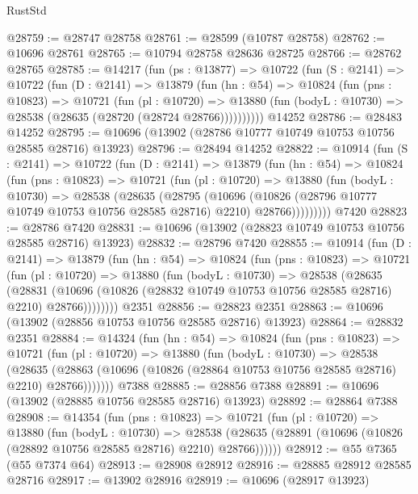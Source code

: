 \begin{lexlean}{RustStd}
\begin{coremodule}
@28759 := @28747 @28758
@28761 := @28599 (@10787 @28758)
@28762 := @10696 @28761
@28765 := @10794 @28758 @28636 @28725
@28766 := @28762 @28765
@28785 := @14217
    (fun (ps : @13877) =>
    @10722
      (fun (S : @2141) =>
      @10722
        (fun (D : @2141) =>
        @13879
          (fun (hn : @54) =>
          @10824
            (fun (pns : @10823) =>
            @10721
              (fun (pl : @10720) =>
              @13880 (fun (bodyL : @10730) => @28538 (@28635 (@28720 (@28724 @28766))))))))))
    @14252
@28786 := @28483 @14252
@28795 := @10696 (@13902 (@28786 @10777 @10749 @10753 @10756 @28585 @28716) @13923)
@28796 := @28494 @14252
@28822 := @10914
    (fun (S : @2141) =>
    @10722
      (fun (D : @2141) =>
      @13879
        (fun (hn : @54) =>
        @10824
          (fun (pns : @10823) =>
          @10721
            (fun (pl : @10720) =>
            @13880
              (fun (bodyL : @10730) =>
              @28538
                (@28635
                  (@28795
                    (@10696
                      (@10826 (@28796 @10777 @10749 @10753 @10756 @28585 @28716) @2210)
                      @28766)))))))))
    @7420
@28823 := @28786 @7420
@28831 := @10696 (@13902 (@28823 @10749 @10753 @10756 @28585 @28716) @13923)
@28832 := @28796 @7420
@28855 := @10914
    (fun (D : @2141) =>
    @13879
      (fun (hn : @54) =>
      @10824
        (fun (pns : @10823) =>
        @10721
          (fun (pl : @10720) =>
          @13880
            (fun (bodyL : @10730) =>
            @28538
              (@28635
                (@28831
                  (@10696 (@10826 (@28832 @10749 @10753 @10756 @28585 @28716) @2210) @28766))))))))
    @2351
@28856 := @28823 @2351
@28863 := @10696 (@13902 (@28856 @10753 @10756 @28585 @28716) @13923)
@28864 := @28832 @2351
@28884 := @14324
    (fun (hn : @54) =>
    @10824
      (fun (pns : @10823) =>
      @10721
        (fun (pl : @10720) =>
        @13880
          (fun (bodyL : @10730) =>
          @28538
            (@28635
              (@28863 (@10696 (@10826 (@28864 @10753 @10756 @28585 @28716) @2210) @28766)))))))
    @7388
@28885 := @28856 @7388
@28891 := @10696 (@13902 (@28885 @10756 @28585 @28716) @13923)
@28892 := @28864 @7388
@28908 := @14354
    (fun (pns : @10823) =>
    @10721
      (fun (pl : @10720) =>
      @13880
        (fun (bodyL : @10730) =>
        @28538 (@28635 (@28891 (@10696 (@10826 (@28892 @10756 @28585 @28716) @2210) @28766))))))
@28912 := @55 @7365 (@55 @7374 @64)
@28913 := @28908 @28912
@28916 := @28885 @28912 @28585 @28716
@28917 := @13902 @28916
@28919 := @10696 (@28917 @13923)

\end{coremodule}
\end{lexlean}
